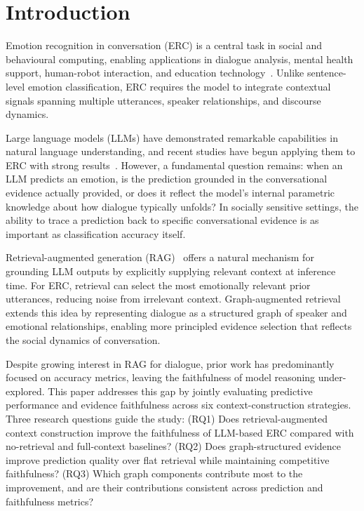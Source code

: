 \documentclass[runningheads]{llncs}
\begin{document}
\section{Introduction}
\label{sec:intro}

Emotion recognition in conversation (ERC) is a central task in social
and behavioural computing, enabling applications in dialogue analysis,
mental health support, human-robot interaction, and education
technology~\cite{poria2019meld,zahiri2018emorynlp}. Unlike
sentence-level emotion classification, ERC requires the model to
integrate contextual signals spanning multiple utterances, speaker
relationships, and discourse dynamics.

Large language models (LLMs) have demonstrated remarkable capabilities
in natural language understanding, and recent studies have begun
applying them to ERC with strong results~\cite{zhao2023chatgpt,wang2023instructerc}.
However, a fundamental question remains: when an LLM predicts an
emotion, is the prediction grounded in the conversational evidence
actually provided, or does it reflect the model's internal parametric
knowledge about how dialogue typically unfolds? In socially sensitive
settings, the ability to trace a prediction back to specific
conversational evidence is as important as classification accuracy
itself.

Retrieval-augmented generation (RAG)~\cite{lewis2020rag} offers a
natural mechanism for grounding LLM outputs by explicitly supplying
relevant context at inference time. For ERC, retrieval can select the
most emotionally relevant prior utterances, reducing noise from
irrelevant context. Graph-augmented retrieval extends this idea by
representing dialogue as a structured graph of speaker and emotional
relationships, enabling more principled evidence selection that reflects
the social dynamics of conversation.

Despite growing interest in RAG for dialogue, prior work has
predominantly focused on accuracy metrics, leaving the faithfulness of
model reasoning under-explored. This paper addresses this gap by
jointly evaluating predictive performance and evidence faithfulness
across six context-construction strategies. Three research questions
guide the study: (RQ1) Does retrieval-augmented context construction
improve the faithfulness of LLM-based ERC compared with no-retrieval
and full-context baselines? (RQ2) Does graph-structured evidence
improve prediction quality over flat retrieval while maintaining
competitive faithfulness? (RQ3) Which graph components contribute most
to the improvement, and are their contributions consistent across
prediction and faithfulness metrics?
\end{document}
